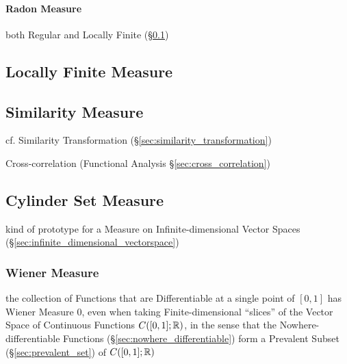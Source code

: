 \paragraph{Radon Measure}\label{sec:radon_measure}\hfill

both Regular and Locally Finite (\S\ref{sec:locally_finite_measure})



\subsection{Locally Finite Measure}\label{sec:locally_finite_measure}

\subsection{Similarity Measure}\label{sec:similarity_measure}

\fist cf. Similarity Transformation (\S\ref{sec:similarity_transformation})

Cross-correlation (Functional Analysis \S\ref{sec:cross_correlation})



\subsection{Cylinder Set Measure}\label{sec:cylinder_set_measure}

kind of prototype for a Measure on Infinite-dimensional Vector Spaces
(\S\ref{sec:infinite_dimensional_vectorspace})



\subsubsection{Wiener Measure}\label{sec:wiener_measure}\hfill

the collection of Functions that are Differentiable at a single point of
$[0,1]$ has Wiener Measure $0$, even when taking Finite-dimensional ``slices''
of the Vector Space of Continuous Functions $C([0,1];\mathbb{R})$, in the sense
that the Nowhere-differentiable Functions (\S\ref{sec:nowhere_differentiable})
form a Prevalent Subset (\S\ref{sec:prevalent_set}) of $C([0,1]; \mathbb{R})$



